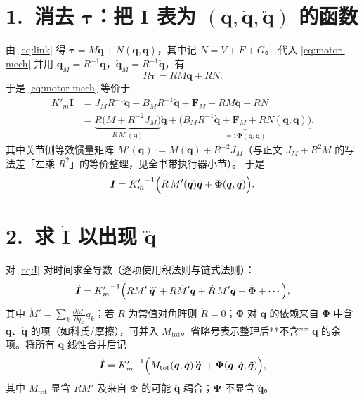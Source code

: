 \documentclass[UTF8,a4paper,12pt]{ctexart}
\begin{document}
\section*{1.\ 消去 $\bm{\tau}$：把 $\bm{I}$ 表为 $(\bm{q},\dot{\bm{q}},\ddot{\bm{q}})$ 的函数}

由 \eqref{eq:link} 得 $\bm{\tau}=M\ddot{\bm{q}}+N(\bm{q},\dot{\bm{q}})$，其中记 $N=V+F+G$。
代入 \eqref{eq:motor-mech} 并用 $\dot{\bm{q}}_M=R^{-1}\dot{\bm{q}}$，$\ddot{\bm{q}}_M=R^{-1}\ddot{\bm{q}}$，有
\begin{equation}
R\bm{\tau}=RM\ddot{\bm{q}}+RN .
\end{equation}
于是 \eqref{eq:motor-mech} 等价于
\begin{align}
K'_m\bm{I}
&=J_MR^{-1}\ddot{\bm{q}}+B_MR^{-1}\dot{\bm{q}}+\bm{F}_M+RM\ddot{\bm{q}}+RN \nonumber\\
&=\underbrace{R\bigl(M+R^{-2}J_M\bigr)}_{R\,M'(\bm{q})}\ddot{\bm{q}}
 +\underbrace{\bigl(B_MR^{-1}\dot{\bm{q}}+\bm{F}_M+RN(\bm{q},\dot{\bm{q}})\bigr)}_{=: \bm{\Phi}(\bm{q},\dot{\bm{q}})} .
\label{eq:I-of-qddot}
\end{align}
其中关节侧等效惯量矩阵 $M'(\bm{q}):=M(\bm{q})+R^{-2}J_M$（与正文 $J_M+R^2M$ 的写法差「左乘 $R^2$」的等价整理，见全书带执行器小节）。
于是
\begin{equation}
\bm{I}={K'_m}^{-1}\Bigl(R\,M'(\bm{q})\ddot{\bm{q}}+\bm{\Phi}(\bm{q},\dot{\bm{q}})\Bigr).
\label{eq:I}
\end{equation}

\section*{2.\ 求 $\dot{\bm{I}}$ 以出现 $\dddot{\bm{q}}$}

对 \eqref{eq:I} 对时间求全导数（逐项使用积法则与链式法则）：
\begin{equation}
\dot{\bm{I}}
={K'_m}^{-1}\Bigl(R M'\dddot{\bm{q}}+R\dot{M}'\ddot{\bm{q}}+\dot{R}\,M'\ddot{\bm{q}}+\dot{\bm{\Phi}}+\cdots\Bigr),
\label{eq:Idot-general}
\end{equation}
其中 $\dot{M}'=\sum_{k}\frac{\partial M'}{\partial q_k}\dot q_k$；若 $R$ 为常值对角阵则 $\dot R=0$；$\dot{\bm{\Phi}}$ 对 $\dddot{\bm{q}}$ 的依赖来自 $\bm{\Phi}$ 中含 $\ddot{\bm{q}}$、$\dot{\bm{q}}$ 的项（如科氏/摩擦），可并入 $M_{\mathrm{tot}}$。省略号表示整理后**不含** $\dddot{\bm{q}}$ 的余项。将所有 $\dddot{\bm{q}}$ 线性合并后记
\begin{equation}
\dot{\bm{I}}={K'_m}^{-1}\Bigl(M_{\mathrm{tot}}(\bm{q},\dot{\bm{q}})\dddot{\bm{q}}+\bm{\Psi}(\bm{q},\dot{\bm{q}},\ddot{\bm{q}})\Bigr),
\label{eq:Idot-compact}
\end{equation}
其中 $M_{\mathrm{tot}}$ 显含 $R M'$ 及来自 $\bm{\Phi}$ 的可能 $\dddot{\bm{q}}$ 耦合；$\bm{\Psi}$ 不显含 $\dddot{\bm{q}}$。
\end{document}
